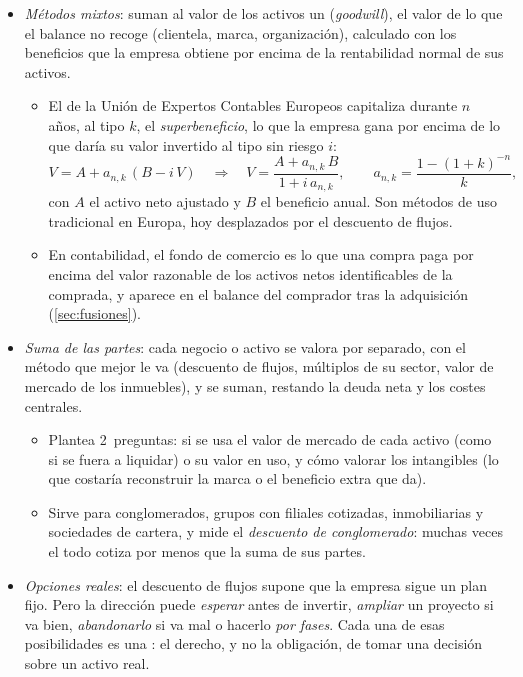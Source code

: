 \documentclass[11pt]{article}
\begin{document}
\begin{itemize}
\item \emph{Métodos mixtos}: suman al valor de los activos un  (\emph{goodwill}), el valor de lo que el balance no recoge (clientela, marca, organización), calculado con los beneficios que la empresa obtiene por encima de la rentabilidad normal de sus activos.
  \begin{itemize}
  \item El de la Unión de Expertos Contables Europeos capitaliza durante $n$ años, al tipo $k$, el \emph{superbeneficio}, lo que la empresa gana por encima de lo que daría su valor invertido al tipo sin riesgo $i$:
    \[
    V=A+a_{n,k}\,(B-i\,V)\quad\Longrightarrow\quad V=\frac{A+a_{n,k}\,B}{1+i\,a_{n,k}},\qquad a_{n,k}=\frac{1-(1+k)^{-n}}{k},
    \]
    con $A$ el activo neto ajustado y $B$ el beneficio anual\nocite{Fernandez2008Metodos}. Son métodos de uso tradicional en Europa, hoy desplazados por el descuento de flujos.
  \item En contabilidad, el fondo de comercio es lo que una compra paga por encima del valor razonable de los activos netos identificables de la comprada, y aparece en el balance del comprador tras la adquisición (\ref{sec:fusiones}).
  \end{itemize}
\item \emph{Suma de las partes}: cada negocio o activo se valora por separado, con el método que mejor le va (descuento de flujos, múltiplos de su sector, valor de mercado de los inmuebles), y se suman, restando la deuda neta y los costes centrales.
  \begin{itemize}
  \item Plantea 2~preguntas: si se usa el valor de mercado de cada activo (como si se fuera a liquidar) o su valor en uso, y cómo valorar los intangibles (lo que costaría reconstruir la marca o el beneficio extra que da).
  \item Sirve para conglomerados, grupos con filiales cotizadas, inmobiliarias y sociedades de cartera, y mide el \emph{descuento de conglomerado}: muchas veces el todo cotiza por menos que la suma de sus partes.
  \end{itemize}
\item \emph{Opciones reales}: el descuento de flujos supone que la empresa sigue un plan fijo. Pero la dirección puede \emph{esperar} antes de invertir, \emph{ampliar} un proyecto si va bien, \emph{abandonarlo} si va mal o hacerlo \emph{por fases}. Cada una de esas posibilidades es una : el derecho, y no la obligación, de tomar una decisión sobre un activo real\nocite{Myers1977Determinants}.

\end{itemize}
\end{document}
